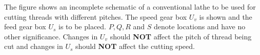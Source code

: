 \iffalse
\title{2008-ME-69-85}
\author{EE24BTECH11010 - BALAJI B}
\section{me}
\chapter{2008}
\fi

    \item The figure shows an incomplete schematic of a conventional lathe to be used for cutting threads with different pitches. The speed gear box $U_v$
 is shown and the feed gear box $U_s$
 is to be placed. $P, Q, R$
 and $S$
 denote locations and have no other significance. Changes in $U_v$
 should \textbf{NOT}
 affect the pitch of thread being cut and changes in $U_s$
 should \textbf{NOT} affect the cutting speed. 
